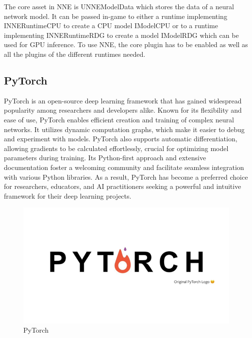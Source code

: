 \documentclass[12pt]{book}
\begin{document}
The core asset in NNE is UNNEModelData which stores the data of a neural network model. It can be passed in-game to either a runtime implementing INNERuntimeCPU to create a CPU model IModelCPU or to a runtime implementing INNERuntimeRDG to create a model IModelRDG which can be used for GPU inference.
To use NNE, the core plugin has to be enabled as well as all the plugins of the different runtimes needed.

\subsection{PyTorch}
PyTorch is an open-source deep learning framework that has gained widespread popularity among
researchers and developers alike. Known for its flexibility and ease of use, PyTorch enables
efficient creation and training of complex neural networks. It utilizes dynamic computation
graphs, which make it easier to debug and experiment with models. PyTorch also supports
automatic differentiation, allowing gradients to be calculated effortlessly, crucial
for optimizing model parameters during training. Its Python-first approach and extensive
documentation foster a welcoming community and facilitate seamless integration with various
Python libraries. As a result, PyTorch has become a preferred choice for researchers,
educators, and AI practitioners seeking a powerful and intuitive framework for their deep
learning projects.
\begin{figure}[!h]
    \centering
    \includegraphics[scale=0.2]{./Figures/Images/Pytorch_logo.png}
    \caption{PyTorch}
    \label{Pytorch}
\end{figure}
\end{document}
